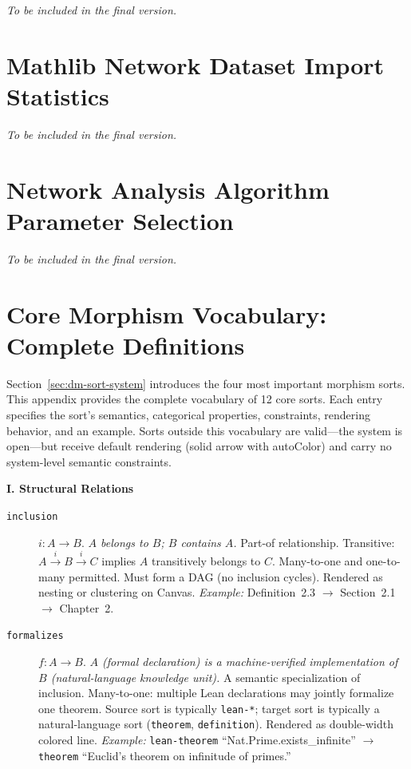 \emph{To be included in the final version.}


\section{Mathlib Network Dataset Import Statistics}
\label{sec:app-mathlib-stats}

\emph{To be included in the final version.}


\section{Network Analysis Algorithm Parameter Selection}
\label{sec:app-analysis-params}

\emph{To be included in the final version.}


\section{Core Morphism Vocabulary: Complete Definitions}
\label{sec:app-mor-vocab}


Section~\ref{sec:dm-sort-system} introduces the four most important morphism sorts. This appendix provides the complete vocabulary of 12 core sorts. Each entry specifies the sort's semantics, categorical properties, constraints, rendering behavior, and an example. Sorts outside this vocabulary are valid---the system is open---but receive default rendering (solid arrow with autoColor) and carry no system-level semantic constraints.

\bigskip

\noindent\textbf{I. Structural Relations}

\begin{description}
\item[\texttt{inclusion}] $i: A \to B$. \emph{$A$ belongs to $B$; $B$ contains $A$.} Part-of relationship. Transitive: $A \xrightarrow{i} B \xrightarrow{i} C$ implies $A$ transitively belongs to $C$. Many-to-one and one-to-many permitted. Must form a DAG (no inclusion cycles). Rendered as nesting or clustering on Canvas. \emph{Example:} Definition~2.3 $\to$ Section~2.1 $\to$ Chapter~2.

\item[\texttt{formalizes}] $f: A \to B$. \emph{$A$ (formal declaration) is a machine-verified implementation of $B$ (natural-language knowledge unit).} A semantic specialization of inclusion. Many-to-one: multiple Lean declarations may jointly formalize one theorem. Source sort is typically \texttt{lean-*}; target sort is typically a natural-language sort (\texttt{theorem}, \texttt{definition}). Rendered as double-width colored line. \emph{Example:} \texttt{lean-theorem} ``Nat.Prime.exists\_infinite'' $\to$ \texttt{theorem} ``Euclid's theorem on infinitude of primes.''
\end{description}

